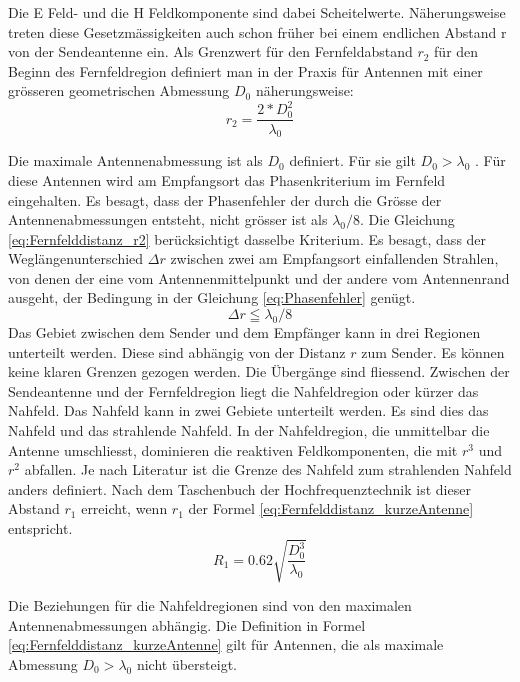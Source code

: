 Die E Feld- und die H Feldkomponente sind dabei Scheitelwerte.
Näherungsweise treten diese Gesetzmässigkeiten auch schon früher bei einem endlichen Abstand r von der Sendeantenne ein. Als Grenzwert für den Fernfeldabstand $r_{2}$ für den Beginn des Fernfeldregion  definiert man in der Praxis für Antennen mit einer grösseren geometrischen Abmessung $D_{0}$ näherungsweise:
\begin{equation}
r_{2}=\dfrac{2*D_{0}^{2}}{\lambda_{0}} \label{eq:Fernfelddistanz_r2}
\end{equation}

Die maximale Antennenabmessung ist als $D_{0}$ definiert. Für sie gilt $D_{0}>\lambda_{0}$ . Für diese Antennen wird am Empfangsort das Phasenkriterium im Fernfeld eingehalten. Es besagt, dass der Phasenfehler der durch die Grösse der Antennenabmessungen entsteht, nicht grösser ist als $\lambda_{0}/8$.  Die Gleichung \ref{eq:Fernfelddistanz_r2} berücksichtigt dasselbe Kriterium. Es besagt, dass der Weglängenunterschied $\Delta r$ zwischen zwei am Empfangsort einfallenden Strahlen, von denen der eine vom Antennenmittelpunkt und der andere vom Antennenrand ausgeht, der Bedingung in der Gleichung \ref{eq:Phasenfehler} genügt.
\begin{equation}
\Delta r\leqq\lambda_{0}/8 \label{eq:Phasenfehler}
\end{equation}
Das Gebiet zwischen dem Sender und dem Empfänger kann in drei Regionen unterteilt werden. Diese sind abhängig von der Distanz $r$ zum Sender. Es können keine klaren Grenzen gezogen werden. Die Übergänge sind fliessend. Zwischen der Sendeantenne und der Fernfeldregion liegt die Nahfeldregion oder kürzer das Nahfeld. Das Nahfeld kann in zwei Gebiete unterteilt werden. Es sind dies das Nahfeld und das strahlende Nahfeld. In der  Nahfeldregion, die unmittelbar die Antenne umschliesst, dominieren die reaktiven Feldkomponenten, die mit $r^{3}$ und $r^{2}$ abfallen.  Je nach Literatur ist die Grenze des Nahfeld zum strahlenden Nahfeld anders definiert. Nach dem Taschenbuch der Hochfrequenztechnik ist dieser Abstand $r_{1}$ erreicht, wenn $r_{1}$ der Formel \ref{eq:Fernfelddistanz_kurzeAntenne} entspricht.
\begin{equation}
R_{1}=0.62\sqrt{\dfrac{D_{0}^{3}}{\lambda_{0}}} \label{eq:Fernfelddistanz_kurzeAntenne}
\end{equation}

Die Beziehungen für die Nahfeldregionen sind von den maximalen Antennenabmessungen abhängig.  Die Definition in Formel \ref{eq:Fernfelddistanz_kurzeAntenne} gilt für Antennen, die als maximale Abmessung $D_{0}>\lambda_{0}$ nicht übersteigt.

